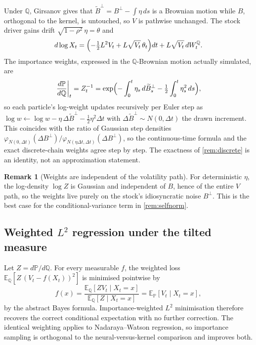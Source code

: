 \documentclass[11pt,a4paper]{article}
\theoremstyle{plain}
\theoremstyle{definition}
\theoremstyle{definition}
\newtheorem{remark}[theorem]{Remark}
\newcommand{\E}{\mathbb{E}}
\newcommand{\Pm}{\mathbb{P}}
\newcommand{\Qm}{\mathbb{Q}}
\newcommand{\Lev}{L}
\begin{document}
Under $\Qm$, Girsanov gives that $\widetilde{B}^\perp = B^\perp - \int \eta\,ds$ is a Brownian motion while $B$, orthogonal to the kernel, is untouched, so $V$ is pathwise unchanged. The stock driver gains drift $\sqrt{1-\rho^2}\,\eta = \theta$ and
\[
  d\log X_t = \Bigl( -\tfrac12 \Lev^2 V_t + \Lev\sqrt{V_t}\,\theta_t \Bigr) dt
    + \Lev\sqrt{V_t}\,dW^{\Qm}_t .
\]
The importance weights, expressed in the $\Qm$-Brownian motion actually simulated, are
\begin{equation}\label{eq:weights}
  \left.\frac{d\Pm}{d\Qm}\right|_{t} = Z_t^{-1}
  = \exp\Bigl( -\int_0^t \eta_s\,d\widetilde{B}^\perp_s
    - \tfrac12 \int_0^t \eta_s^2\,ds \Bigr),
\end{equation}
so each particle's log-weight updates recursively per Euler step as $\log w \leftarrow \log w - \eta\,\Delta\widetilde{B}^\perp - \tfrac12 \eta^2 \Delta t$ with $\Delta\widetilde{B}^\perp \sim N(0, \Delta t)$ the drawn increment. This coincides with the ratio of Gaussian step densities $\varphi_{N(0,\Delta t)}(\Delta B^\perp) / \varphi_{N(\eta\Delta t,\Delta t)}(\Delta B^\perp)$, so the continuous-time formula and the exact discrete-chain weights agree step by step. The exactness of \cref{rem:discrete} is an identity, not an approximation statement.

\begin{remark}[Weights are independent of the volatility path]\label{rem:indep}
For deterministic $\eta$, the log-density $\log Z$ is Gaussian and independent of $B$, hence of the entire $V$ path, so the weights live purely on the stock's idiosyncratic noise $B^\perp$. This is the best case for the conditional-variance term in \cref{rem:selfnorm}.
\end{remark}

\subsection{Weighted $L^2$ regression under the tilted measure}

Let $Z = d\Pm/d\Qm$. For every measurable $f$, the weighted loss $\E_{\Qm}\!\left[ Z\,(V_t - f(X_t))^2 \right]$ is minimised pointwise by
\begin{equation}\label{eq:weightedreg}
  f(x) = \frac{\E_{\Qm}[Z V_t \mid X_t = x]}{\E_{\Qm}[Z \mid X_t = x]}
       = \E_{\Pm}[V_t \mid X_t = x],
\end{equation}
by the abstract Bayes formula. Importance-weighted $L^2$ minimisation therefore recovers the correct conditional expectation with no further correction. The identical weighting applies to Nadaraya--Watson regression, so importance sampling is orthogonal to the neural-versus-kernel comparison and improves both.
\end{document}
